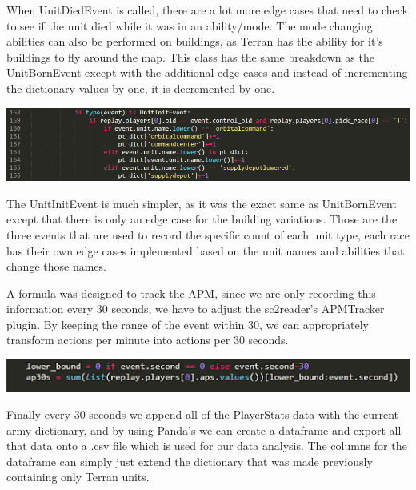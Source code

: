 \documentclass[a4paper,12pt]{report}
\begin{document}
When UnitDiedEvent is called, there are a lot more edge cases that need to check to see if the unit died while it was in an ability/mode. The mode changing abilities can also be performed on buildings, as Terran has the ability for it’s buildings to fly around the map. This class has the same breakdown as the UnitBornEvent except with the additional edge cases and instead of incrementing the dictionary values by one, it is decremented by one. 

\begin{center}
    \captionsetup{type=figure}
    \includegraphics[width=.9\linewidth]{media/InitEdgeCases.png}
\end{center}

The UnitInitEvent is much simpler, as it was the exact same as UnitBornEvent except that there is only an edge case for the building variations. Those are the three events that are used to record the specific count of each unit type, each race has their own edge cases implemented based on the unit names and abilities that change those names. 

A formula was designed to track the APM, since we are only recording this information every 30 seconds, we have to adjust the sc2reader’s APMTracker plugin. By keeping the range of the event within 30, we can appropriately transform actions per minute into actions per 30 seconds. 

\begin{center}
    \captionsetup{type=figure}
    \includegraphics[width=.9\linewidth]{media/APMtrackCode.png}
\end{center}

Finally every 30 seconds we append all of the PlayerStats data with the current army dictionary, and by using Panda’s we can create a dataframe and export all that data onto a .csv file which is used for our data analysis. The columns for the dataframe can simply just extend the dictionary that was made previously containing only Terran units.
\end{document}
